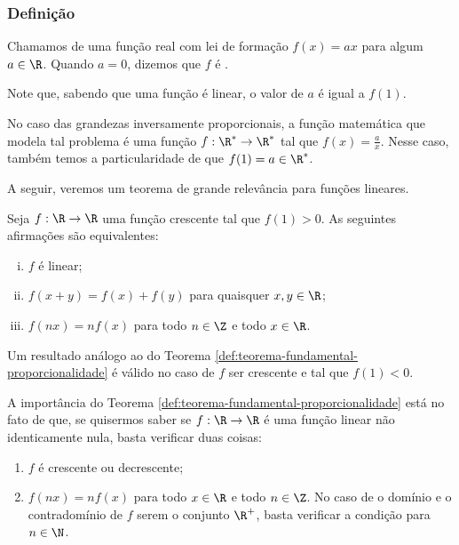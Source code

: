 \subsubsection{Definição}

\begin{definition}
    Chamamos de  uma função real com lei de formação
$f(x) = ax$ para algum $a \in \R$. Quando $a = 0$, dizemos que $f$ é .
\end{definition}

\begin{remark}
Note que, sabendo que uma função é linear, o valor de $a$ é igual a
$f(1)$.
\end{remark}

No caso das grandezas inversamente proporcionais, a função
matemática que modela tal problema é uma função $f: \R^* \to
\R^*$ tal que $f(x) = \frac a x$. 
Nesse caso, também temos a
particularidade de que $f(1) = a \in \R^*$.

A seguir, veremos um teorema de grande relevância para funções lineares.

\begin{theorem}
\label{def:teorema-fundamental-proporcionalidade}
Seja $f: \R \to \R$ uma função crescente tal que $f(1)>0$. 
As seguintes afirmações são equivalentes:
%
\begin{enumerate}[(i)]
  \item $f$ é linear;
  \item $f(x+y) = f(x) + f(y)$ para quaisquer $x, y \in \R$;
  \item $f(nx) = nf(x)$ para todo $n \in \Z$ e todo $x \in \R$.
\end{enumerate}
\end{theorem}

\begin{remark}
    Um resultado análogo ao do Teorema \ref{def:teorema-fundamental-proporcionalidade} é válido
    no caso de $f$ ser crescente e tal que $f(1) < 0$.
\end{remark}

A importância do Teorema \ref{def:teorema-fundamental-proporcionalidade} 
está no fato de que, se quisermos saber se $f: \R \to \R$ é uma função linear não identicamente nula,
basta verificar duas coisas:
%
\begin{enumerate}[1.]
  \item $f$ é crescente ou decrescente;
  \item $f(nx) = n f(x)$ para todo $x \in \R$ e todo $n \in \Z$. No
  caso de o domínio e o contradomínio de $f$ serem o conjunto $\R^+$, basta verificar a condição
  para $n \in \N$.
\end{enumerate}

